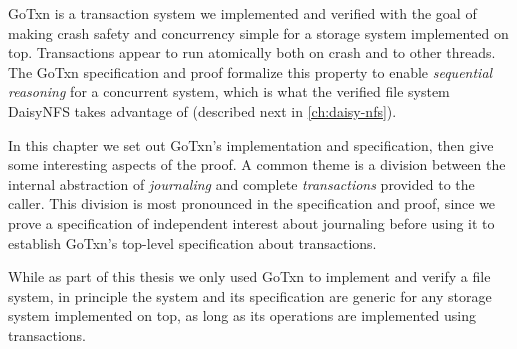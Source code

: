 GoTxn is a transaction system we implemented and verified with the goal of
making crash safety and concurrency simple for a storage system implemented on
top. Transactions appear to run atomically both on crash and to other threads.
The GoTxn specification and proof formalize this property to enable
\emph{sequential reasoning} for a concurrent system, which is what the verified
file system DaisyNFS takes advantage of (described next in
\cref{ch:daisy-nfs}).

In this chapter we set out GoTxn's implementation and specification, then give
some interesting aspects of the proof. A common theme is a division between the
internal abstraction of \emph{journaling} and complete \emph{transactions}
provided to the caller. This division is most pronounced in the specification
and proof, since we prove a specification of independent interest about
journaling before using it to establish GoTxn's top-level specification about
transactions.

While as part of this thesis we only used GoTxn to implement and verify a file
system, in principle the system and its specification are generic for any
storage system implemented on top, as long as its operations are implemented
using transactions.

%



%






